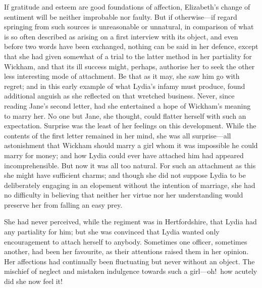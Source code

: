 \documentclass[12pt,english,oneside]{book}
\begin{document}
If gratitude and esteem are good foundations of affection, Elizabeth's
change of sentiment will be neither improbable nor faulty. But if
otherwise\mbox{---}if regard springing from such sources is unreasonable
or unnatural, in comparison of what is so often described as arising
on a first interview with its object, and even before two words have
been exchanged, nothing can be said in her defence, except that she
had given somewhat of a trial to the latter method in her partiality
for Wickham, and that its ill success might, perhaps, authorise her
to seek the other less interesting mode of attachment. Be that as
it may, she saw him go with regret; and in this early example of what
Lydia's infamy must produce, found additional anguish as she reflected
on that wretched business. Never, since reading Jane's second letter,
had she entertained a hope of Wickham's meaning to marry her. No one
but Jane, she thought, could flatter herself with such an expectation.
Surprise was the least of her feelings on this development. While
the contents of the first letter remained in her mind, she was all
surprise\mbox{---}all astonishment that Wickham should marry a girl
whom it was impossible he could marry for money; and how Lydia could
ever have attached him had appeared incomprehensible. But now it was
all too natural. For such an attachment as this she might have sufficient
charms; and though she did not suppose Lydia to be deliberately engaging
in an elopement without the intention of marriage, she had no difficulty
in believing that neither her virtue nor her understanding would preserve
her from falling an easy prey.

She had never perceived, while the regiment was in Hertfordshire,
that Lydia had any partiality for him; but she was convinced that
Lydia wanted only encouragement to attach herself to anybody. Sometimes
one officer, sometimes another, had been her favourite, as their attentions
raised them in her opinion. Her affections had continually been fluctuating
but never without an object. The mischief of neglect and mistaken
indulgence towards such a girl\mbox{---}oh!\ how acutely did she
now feel it!
\end{document}
